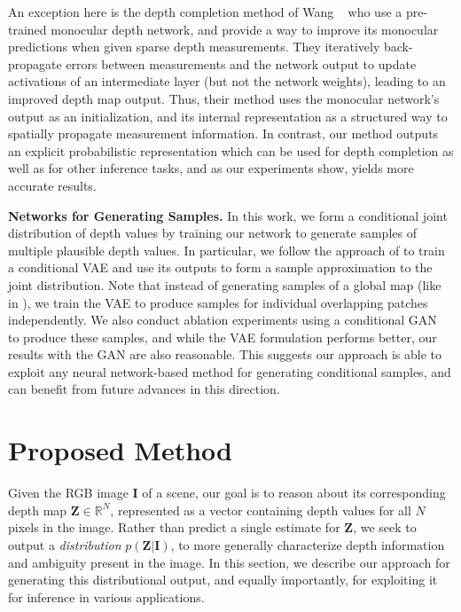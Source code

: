 \documentclass[10pt,twocolumn,letterpaper]{article}
\begin{document}
An exception here is the depth completion method of Wang \etal~\cite{wang2019plug} who use a pre-trained monocular depth network, and provide a way to improve its monocular predictions when given sparse depth measurements. They iteratively back-propagate errors between measurements and the network output to update activations of an intermediate layer (but not the network weights), leading to an improved depth map output. Thus, their method uses the monocular network's output as an initialization, and its internal representation as a structured way to spatially propagate measurement information. In contrast, our method outputs an explicit probabilistic representation which can be used for depth completion as well as for other inference tasks, and as our experiments show, yields more accurate results.

\noindent\textbf{Networks for Generating Samples.} In this work, we form a conditional joint distribution of depth values by training our network to generate samples of multiple plausible depth values. In particular, we follow the approach of \cite{condVAE} to train a conditional VAE and use its outputs to form a sample approximation to the joint distribution. Note that instead of generating samples of a global map (like in \cite{condVAE}), we train the VAE to produce samples for individual overlapping patches independently. We also conduct ablation experiments using a conditional GAN~\cite{goodfellow2014generative,mirza2014conditional} to produce these samples, and while the VAE formulation performs better, our results with the GAN are also reasonable. This suggests our approach is able to exploit any neural network-based method for generating conditional samples, and can benefit from future advances in this direction.

\newcommand{\paras}[1]{\noindent\textbf{#1}}
\renewcommand{\Phi}{\mathcal{S}}
\newcommand{\crop}{\mathcal{P}_i}
\newcommand{\patch}{\mathbf{x}}
\newcommand{\Z}{\mathbf{Z}}
\newcommand{\I}{\mathbf{I}}
\newcommand{\A}{\mathbf{A}}


\section{Proposed Method}
\label{sec:net}

Given the RGB image $\I$ of a scene, our goal is to reason about its corresponding depth map $\Z\in \mathbb{R}^N$, represented as a vector containing depth values for all $N$ pixels in the image. Rather than predict a single estimate for $\Z$, we seek to output a \emph{distribution} $p(\Z|\I)$, to more generally characterize depth information and ambiguity present in the image. In this section, we describe our approach for generating this distributional output, and equally importantly, for exploiting it for inference in various applications.
\end{document}
